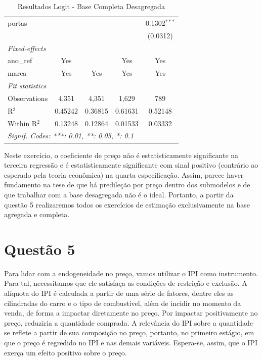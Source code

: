 \documentclass{article}
\begin{document}
\begin{table}[H]
\begin{tabular}{lcccc}
   portas       &                                &                         &                         & 0.1302$^{***}$\\   
                &                                &                         &                         & (0.0312)\\   
   \midrule
   \emph{Fixed-effects}\\
   ano\_ref     & Yes                            &                         & Yes                     & Yes\\  
   marca        & Yes                            & Yes                     & Yes                     & Yes\\  
   \midrule
   \emph{Fit statistics}\\
   Observations & 4,351                          & 4,351                   & 1,629                   & 789\\  
   R$^2$        & 0.45242                        & 0.36815                 & 0.61631                 & 0.52148\\  
   Within R$^2$ & 0.13248                        & 0.12864                 & 0.01533                 & 0.03332\\  
   \midrule \midrule
   \multicolumn{5}{l}{\emph{Signif. Codes: ***: 0.01, **: 0.05, *: 0.1}}\\
\end{tabular}
\par\endgroup
\caption{Resultados Logit - Base Completa Desagregada}\label{tablogitdes}
\end{table}

Neste exercício, o coeficiente de preço não é estatisticamente significante na terceira regressão e é estatisticamente significante com sinal positivo (contrário ao esperado pela teoria econômica) na quarta especificação. Assim, parece haver fundamento na tese de que há predileção por preço dentro dos submodelos e de que trabalhar com a base desagregada não é o ideal. Portanto, a partir da questão 5 realizaremos todos os exercícios de estimação exclusivamente na base agregada e completa.

\section*{Questão 5}

Para lidar com a endogeneidade no preço, vamos utilizar o IPI como instrumento. Para tal, necessitamos que ele satisfaça as condições de restrição e exclusão. A alíquota do IPI é calculada a partir de uma série de fatores, dentre eles as cilindradas do carro e o tipo de combustível, além de incidir no momento da venda, de forma a impactar diretamente no preço. Por impactar positivamente no preço, reduziria a quantidade comprada. A relevância do IPI sobre a quantidade se reflete a partir de sua composição no preço, portanto,  no primeiro estágio, em que o preço é regredido no IPI e nas demais variáveis. Espera-se, assim, que o IPI exerça um efeito positivo sobre o preço.
\end{document}
